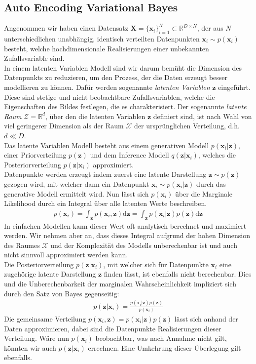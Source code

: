 \documentclass[12pt]{article}
\newcommand{\R}{\mathbb{R}}
\newcommand{\z}{\mathbf{z}}
\newcommand{\x}{\mathbf{x}_i}
\begin{document}
	\subsection[Auto Encoding Variational Bayes]{Auto Encoding Variational Bayes}
	Angenommen wir haben einen Datensatz $\textbf{X} = \lbrace\x \rbrace_{i=1}^{N} \subset \R^{D\times N}$, der aus $N$ unterschiedlichen unabhängig, identisch verteilten Datenpunkten $\x\sim p(\x)$ besteht, welche hochdimensionale Realisierungen einer unbekannten Zufallsvariable sind.\\
	In einem latenten Variablen Modell sind wir darum bemüht die Dimension des Datenpunkts zu reduzieren, um den Prozess, der die Daten erzeugt besser modellieren zu können.
	Dafür werden sogenannte \emph{latenten Variablen} $\z$ eingeführt. Diese sind stetige und nicht beobachtbare Zufallsvariablen, welche die Eigenschaften des Bildes festlegen, die es charakterisiert.
	Der sogenannte \emph{latente Raum} $\mathcal{Z} = \R^d$, über den die latenten Variablen $\z$ definiert sind, ist nach Wahl von viel geringerer Dimension als der Raum $\mathcal{X}$ der ursprünglichen Verteilung, d.h. $d \ll D$.\\
	Das latente Variablen Modell besteht aus einem generativen Modell $p(\x|\z)$, einer Priorverteilung $p(\z)$ und dem Inference Modell $q(\z|\x)$, welches die Posteriorverteilung $p(\z|\x)$ approximiert.\\
	Datenpunkte werden erzeugt indem zuerst eine latente Darstellung $\z \sim  p(\z)$  gezogen wird, mit welcher dann ein Datenpunkt  $\x \sim  p(\x|\z)$ durch das generative Modell ermittelt wird. Nun lässt sich $p(\x)$ über die Marginale Likelihood durch ein Integral über alle latenten Werte beschreiben.
	\begin{align*}
	p(\x)= \int_{\z} p(\x,\z) \mathrm{d}\textbf{z} = \int_{\z} p(\x|\z)p(\z) \mathrm{d}\z
	\end{align*}
	In einfachen Modellen kann dieser Wert oft analytisch berechnet und maximiert werden.
	Wir nehmen aber an, dass dieses Integral aufgrund der hohen Dimension des Raumes $\mathcal{X}$ und der Komplexität des Modells unberechenbar ist und auch nicht sinnvoll approximiert werden kann.\\
	Die Posteriorverteilung $p(\z|\x)$, mit welcher sich für Datenpunkte $\x$ eine zugehörige latente Darstellung $\z$ finden lässt, ist ebenfalls nicht berechenbar. Dies und die Unberechenbarkeit der marginalen Wahrscheinlichkeit impliziert sich durch den Satz von Bayes gegenseitig:
	\begin{align*}
	p(\z|\x)= \frac{p(\x|\z)p(\z)}{p(\x)}
	\end{align*}
	Die gemeinsame Verteilung $p(\x,\z) = p(\x|\z)p(\z)$ lässt sich anhand der Daten approximieren, dabei sind die Datenpunkte Realisierungen dieser Verteilung. Wäre nun $p(\x)$ beobachtbar, was nach Annahme nicht gilt, könnten wir auch $p(\z|\x)$ errechnen. Eine Umkehrung dieser Überlegung gilt ebenfalls. \\
\end{document}
